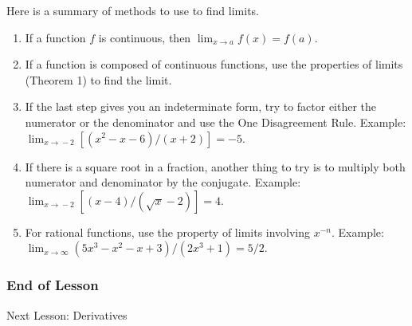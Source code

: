 \documentclass[xcolor=dvipsnames]{beamer}
\begin{document}
\begin{frame}
Here is a summary of methods to use to find limits.
\begin{enumerate}
\item If a function $f$ is continuous, then
  $\lim_{x\rightarrow{}a}f(x)=f(a)$.
\item If a function is composed of continuous functions, use the
  properties of limits (Theorem 1) to find the limit.
\item If the last step gives you an indeterminate form, try to factor
  either the numerator or the denominator and use the One Disagreement
  Rule. Example: $\lim_{x\rightarrow{}-2}[(x^{2}-x-6)/(x+2)]=-5$.
\item If there is a square root in a fraction, another thing to try is
  to multiply both numerator and denominator by the conjugate.
  Example: $\lim_{x\rightarrow{}-2}[(x-4)/(\sqrt{x}-2)]=4$.
\item For rational functions, use the property of limits involving
  $x^{-n}$. Example:
  $\lim_{x\rightarrow\infty}(5x^{3}-x^{2}-x+3)/(2x^{3}+1)=5/2$.
\end{enumerate}
\end{frame}

\begin{frame}
  \frametitle{End of Lesson}
Next Lesson: Derivatives
\end{frame}
\end{document}
